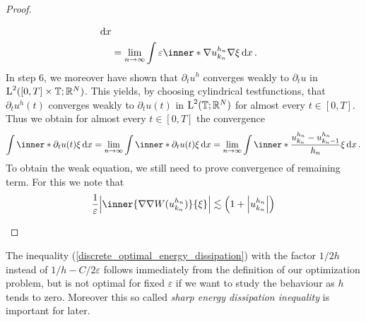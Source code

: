 \begin{proof}
\begin{description}[wide=0pt]
\begin{align*}
			\dd{x }
		\\
		& = 
		\lim_{ n \to \infty }
			\int
				\varepsilon
				\inner*{ \nabla u_{ k_{ n } }^{ h_{ n } } }{ \nabla \xi }
			\dd{ x }.
	\end{align*}
	In step 6, we moreover have shown that $ \partial_{ t } u^{ h } $ converges weakly to $ \partial_{t } u $ in $ \operatorname{L}^{ 2 } ( [ 0, T ] \times \operatorname{\mathbb{T}} ; \mathbb{ R }^{ N } ) $. This yields, by choosing cylindrical testfunctions, that $ \partial_{ t } u^{ h } ( t ) $ converges weakly to $ \partial_{ t } u ( t ) $ in $ \operatorname{L}^{ 2 } ( \operatorname{\mathbb{T}} ; \mathbb{ R }^{ N } ) $ for almost every $ t \in [ 0 , T ] $.
	Thus we obtain for almost every $ t\in [ 0 , T ] $ the convergence
	\begin{equation*}
		\int
			\inner*{ \partial_{ t } u ( t ) }{ \xi }
		\dd{ x }
		=
		\lim_{ n \to \infty }
			\int
				\inner*{ \partial_{ t } u ( t ) }{ \xi }
			\dd{ x }
		=
		\lim_{ n \to \infty }
			 \int
			 	\inner*{ \frac{ u_{ k_{ n } }^{ h_{ n } } - u_{ k_{ n } - 1 }^{ h_{ n } } }{ h_{ n } } }{ \xi }
			 \dd{ x }.
	\end{equation*}
	To obtain the weak equation, we still need to prove convergence of remaining term. For this we note that 
	\begin{equation*}
		\frac{ 1 }{ \varepsilon }
		\abs{ \inner{ \nabla \nabla W ( u_{ k_{ n } }^{ h_{ n } } ) }{ \xi } }
		\lesssim
		\left( 1 + \abs{ u_{  k_{ n } }^{ h_{ n } } } \right)
	\end{equation*}
	\end{description}
\end{proof}

\begin{remark}
	The inequality (\ref{discrete_optimal_energy_dissipation}) with the factor $ 1/2h $ instead of $ 1/h- C/2\varepsilon $ follows immediately from the definition of our optimization problem, but is not optimal for fixed $ \varepsilon $ if we want to study the behaviour as $ h $ tends to zero. Moreover this so called \emph{sharp energy dissipation inequality} is important for later.
\end{remark}







